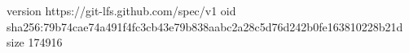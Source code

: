 version https://git-lfs.github.com/spec/v1
oid sha256:79b74cae74a491f4fc3cb43e79b838aabc2a28c5d76d242b0fe163810228b21d
size 174916
